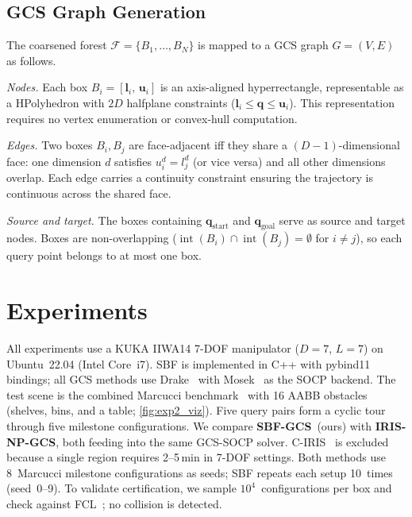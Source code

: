\documentclass[letterpaper, conference]{IEEEtran}
\newcommand{\calF}{\mathcal{F}}
\DeclareMathOperator{\interior}{int}
\begin{document}
\subsection{GCS Graph Generation}\label{sec:gcs_graph}

The coarsened forest $\calF = \{B_1,\ldots,B_N\}$ is mapped to a
GCS graph $G=(V,E)$ as follows.

\emph{Nodes.}
Each box $B_i = [\bm{l}_i,\,\bm{u}_i]$ is an axis-aligned
hyperrectangle, representable as a HPolyhedron with $2D$ halfplane
constraints ($\bm{l}_i \leq \bm{q} \leq \bm{u}_i$).
This representation requires no vertex enumeration or convex-hull
computation.

\emph{Edges.}
Two boxes $B_i,B_j$ are face-adjacent iff they share a
$(D{-}1)$-dimensional face: one dimension $d$ satisfies
$u_i^d = l_j^d$ (or vice versa) and all other dimensions overlap.
Each edge carries a continuity constraint ensuring the trajectory
is continuous across the shared face.

\emph{Source and target.}
The boxes containing $\bm{q}_\text{start}$ and $\bm{q}_\text{goal}$
serve as source and target nodes.
Boxes are non-overlapping
($\interior(B_i) \cap \interior(B_j) = \emptyset$ for $i \neq j$),
so each query point belongs to at most one box.

\section{Experiments}\label{sec:experiments}

All experiments use a KUKA IIWA14 7-DOF manipulator
($D{=}7$, $L{=}7$) on Ubuntu~22.04 (Intel Core~i7).
SBF is implemented in C++ with pybind11 bindings;
all GCS methods use Drake~\cite{tedrake2019drake} with
Mosek~\cite{mosek2024} as the SOCP backend.
The test scene is the combined Marcucci
benchmark~\cite{marcucci2024motion} with 16 AABB obstacles
(shelves, bins, and a table; \cref{fig:exp2_viz}).
Five query pairs form a cyclic tour through five milestone
configurations.
We compare \textbf{SBF-GCS}~(ours) with \textbf{IRIS-NP-GCS},
both feeding into the same GCS-SOCP solver.
C-IRIS~\cite{werner2024certified} is excluded because a single
region requires 2--5\,min in 7-DOF settings.
Both methods use 8~Marcucci milestone configurations as seeds;
SBF repeats each setup 10~times (seed~0--9).
To validate certification, we sample $10^4$~configurations per box
and check against FCL~\cite{pan2012fcl}; no collision is detected.
\end{document}
